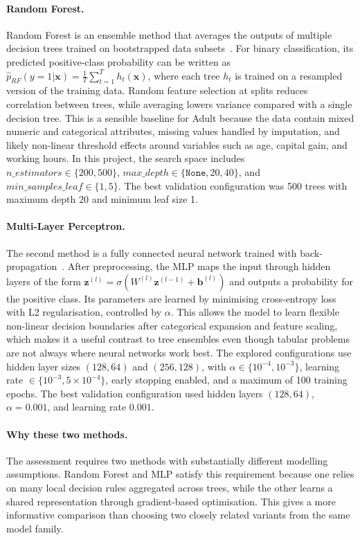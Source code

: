 \documentclass[10pt,twocolumn,letterpaper]{article}
\begin{document}
\paragraph{Random Forest.}
Random Forest is an ensemble method that averages the outputs of multiple decision trees trained on bootstrapped data subsets~\cite{breiman2001randomforest}. For binary classification, its predicted positive-class probability can be written as $\hat{p}_{RF}(y=1|\mathbf{x})=\frac{1}{T}\sum_{t=1}^{T}h_t(\mathbf{x})$, where each tree $h_t$ is trained on a resampled version of the training data. Random feature selection at splits reduces correlation between trees, while averaging lowers variance compared with a single decision tree. This is a sensible baseline for Adult because the data contain mixed numeric and categorical attributes, missing values handled by imputation, and likely non-linear threshold effects around variables such as age, capital gain, and working hours. In this project, the search space includes $n\_estimators \in \{200, 500\}$, $max\_depth \in \{\texttt{None}, 20, 40\}$, and $min\_samples\_leaf \in \{1, 5\}$. The best validation configuration was 500 trees with maximum depth 20 and minimum leaf size 1.

\paragraph{Multi-Layer Perceptron.}
The second method is a fully connected neural network trained with back-propagation~\cite{rumelhart1986backprop}. After preprocessing, the MLP maps the input through hidden layers of the form $\mathbf{z}^{(l)}=\sigma(W^{(l)}\mathbf{z}^{(l-1)}+\mathbf{b}^{(l)})$ and outputs a probability for the positive class. Its parameters are learned by minimising cross-entropy loss with L2 regularisation, controlled by $\alpha$. This allows the model to learn flexible non-linear decision boundaries after categorical expansion and feature scaling, which makes it a useful contrast to tree ensembles even though tabular problems are not always where neural networks work best. The explored configurations use hidden layer sizes $(128, 64)$ and $(256, 128)$, with $\alpha \in \{10^{-4}, 10^{-3}\}$, learning rate $\in \{10^{-3}, 5\times10^{-4}\}$, early stopping enabled, and a maximum of 100 training epochs. The best validation configuration used hidden layers $(128,64)$, $\alpha = 0.001$, and learning rate $0.001$.

\paragraph{Why these two methods.}
The assessment requires two methods with substantially different modelling assumptions. Random Forest and MLP satisfy this requirement because one relies on many local decision rules aggregated across trees, while the other learns a shared representation through gradient-based optimisation. This gives a more informative comparison than choosing two closely related variants from the same model family.
\end{document}
